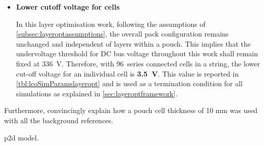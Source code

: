 \begin{enumerate}[
    leftmargin=0pt, itemindent=20pt,
    labelwidth=15pt, labelsep=5pt, listparindent=0.7cm,
    align=left]
\begin{itemize}[ leftmargin=10pt, itemindent=15pt, labelwidth=5pt, labelsep=5pt, listparindent=0.7cm, align=left]
        \item \hypertarget{celllowercutoff}{\textbf{Lower cutoff voltage for cells}}

            In  this  layer  optimisation  work, following  the  assumptions  of
            \cref{subsec:layeroptassumptions},  the  overall pack  configuration
            remains  unchanged  and  independent   of  layers  within  a  pouch.
            This  implies that  the undervoltage  threshold for  DC bus  voltage
            throughout  this   work  shall  remain  fixed   at  \SI{336}{\volt}.
            Therefore, with  96~series connected  cells in  a string,  the lower
            cut-off voltage for an  individual cell is \textbf{\SI{3.5}{\volt}}.
            This  value is  reported in  \cref{tbl:lcoSimParamslayeropt} and  is
            used as a termination condition  for all simulations as explained in
            \cref{sec:layeroptframework}.

    \end{itemize}


    \end{enumerate}


 Furthermore, convincingly explain how a pouch cell thickness of 10 mm
was used with all the background references.



\gls{p2d} model. %





